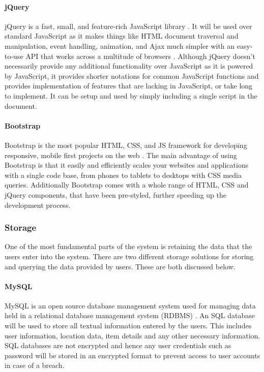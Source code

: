 \paragraph{jQuery} jQuery is a fast, small, and feature-rich JavaScript library \cite{jQuery:Home}. It will be used over standard JavaScript as it makes things like HTML document traversal and manipulation, event handling, animation, and Ajax much simpler with an easy-to-use API that works across a multitude of browsers \cite{jQuery:Home}. Although jQuery doesn't necessarily provide any additional functionality over JavaScript as it is powered by JavaScript, it provides shorter notations for common JavaScript functions and provides implementation of features that are lacking in JavaScript, or take long to implement. It can be setup and used by simply including a single script in the document.

\paragraph{Bootstrap} Bootstrap is the most popular HTML, CSS, and JS framework for developing responsive, mobile first projects on the web \cite{Bootstrap:Home}. The main advantage of using Bootstrap is that it easily and efficiently scales your websites and applications with a single code base, from phones to tablets to desktops with CSS media queries. Additionally Bootstrap comes with a whole range of HTML, CSS and jQuery components, that have been pre-styled, further speeding up the development process.

\subsubsection{Storage}
One of the most fundamental parts of the system is retaining the data that the users enter into the system. There are two different storage solutions for storing and querying the data provided by users. These are both discussed below.

\paragraph{MySQL} MySQL is an open source database management system used for managing data held in a relational database management system (RDBMS) \cite{MySQL:Home}. An SQL database will be used to store all textual information entered by the users. This includes user information, location data, item details and any other necessary information. SQL databases are not encrypted and hence any user credentials such as password will be stored in an encrypted format to prevent access to user accounts in case of a breach.

